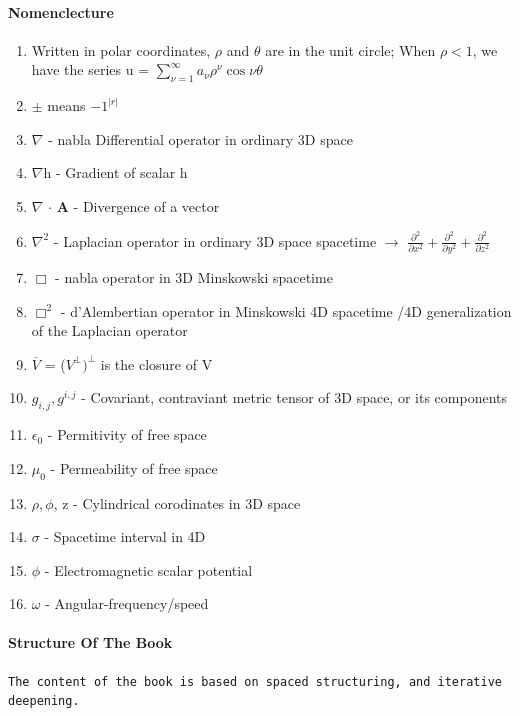 \documentclass[a4paper, 10pt, onepage]{elegantbook}
\begin{document}
\paragraph{Nomenclecture}
\begin{enumerate}
    \item Written in polar coordinates, $\rho$ and $\theta$ are in the unit circle; When $\rho < 1$, we have the series u = $ \sum_{\nu=1}^\infty a_\nu \rho^{\nu} \cos \nu \theta$  
    \item $\pm$ means $-1^{|r|}$ 
    \item $\nabla$ - nabla Differential operator in ordinary 3D space
    \item $\nabla$h - Gradient of scalar h 
    \item $\nabla$ $\cdot$ $\mathbf A$ - Divergence of a vector 
    \item $\nabla^2$ - Laplacian operator in ordinary 3D space spacetime $\longrightarrow$ $\frac{\partial^2}{\partial x^2} + \frac{\partial^2}{\partial y^2} + \frac{\partial^2}{\partial z^2}$ 
    \item $\Box$ - nabla operator in 3D Minskowski spacetime 
    \item $\Box^2$ - d'Alembertian operator in Minskowski 4D spacetime /4D generalization of the Laplacian operator
    \item $\overline{V}$ = ($V^\perp)^\perp$ is the closure of V 
    \item $g_{i,j}, g^{i,j}$ - Covariant, contraviant metric tensor of 3D space, or its components
    \item $\epsilon_0$ - Permitivity of free space 
    \item $\mu_0$ - Permeability of free space
    \item $\rho, \phi$, z - Cylindrical corodinates in 3D space 
    \item $\sigma$ - Spacetime interval in 4D 
    \item $\phi$ - Electromagnetic scalar potential 
    \item $\omega$ - Angular-frequency/speed 

\end{enumerate}

\paragraph{Structure Of The Book}

\begin{lstlisting}
The content of the book is based on spaced structuring, and iterative deepening.
\end{lstlisting}
\end{document}
